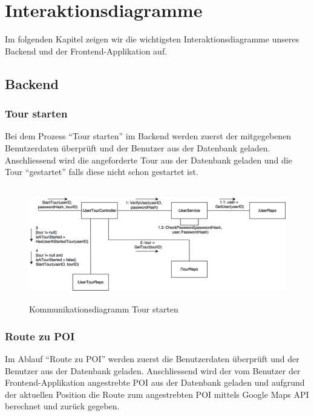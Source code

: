 \documentclass[a4paper,10pt,xetex]{article}
\begin{document}
\newpage
\section{Interaktionsdiagramme}\label{interaktionsdiagramme}
Im folgenden Kapitel zeigen wir die wichtigsten Interaktionsdiagramme unseres Backend und der Frontend-Applikation auf.

\subsection{Backend}\label{backend}

\subsubsection{Tour starten}
Bei dem Prozess ``Tour starten'' im Backend werden zuerst der mitgegebenen Benutzerdaten
überprüft und der Benutzer aus der Datenbank geladen. Anschliessend wird die angeforderte
Tour aus der Datenbank geladen und die Tour ``gestartet'' falls diese nicht schon gestartet ist.

\begin{figure}
  \centering
  \includegraphics[height=5cm]{Kommunikationsdiagramm_StartTour}
  \caption{Kommunikationsdiagramm Tour starten}
\end{figure}

\subsubsection{Route zu POI}
Im Ablauf ``Route zu POI'' werden zuerst die Benutzerdaten überprüft und der Benutzer aus
der Datenbank geladen. Anschliessend wird der vom Benutzer der Frontend-Applikation angestrebte
POI aus der Datenbank geladen und aufgrund der aktuellen Position die Route zum angestrebten
POI mittels Google Maps API berechnet und zurück gegeben.
\end{document}

